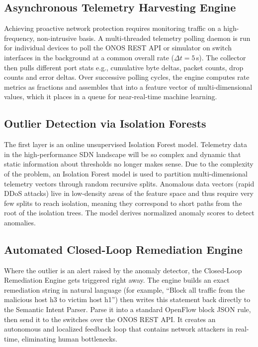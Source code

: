 \documentclass[conference]{IEEEtran}
\begin{document}
\subsection{Asynchronous Telemetry Harvesting Engine}
Achieving proactive network protection requires monitoring traffic on a high-frequency, non-intrusive basis. A multi-threaded telemetry polling daemon is run for individual devices to poll the ONOS REST API or simulator on switch interfaces in the background at a common overall rate ($\Delta t = 5$\,s). The collector then pulls different port stats e.g., cumulative byte deltas, packet counts, drop counts and error deltas. Over successive polling cycles, the engine computes rate metrics as fractions and assembles that into a feature vector of multi-dimensional values, which it places in a queue for near-real-time machine learning.

\subsection{Outlier Detection via Isolation Forests}
The first layer is an online unsupervised Isolation Forest model. Telemetry data in the high-performance SDN landscape will be so complex and dynamic that static information about thresholds no longer makes sense. Due to the complexity of the problem, an Isolation Forest model is used to partition multi-dimensional telemetry vectors through random recursive splits. Anomalous data vectors (rapid DDoS attacks) live in low-density areas of the feature space and thus require very few splits to reach isolation, meaning they correspond to short paths from the root of the isolation trees. The model derives normalized anomaly scores to detect anomalies.

\subsection{Automated Closed-Loop Remediation Engine}
Where the outlier is an alert raised by the anomaly detector, the Closed-Loop Remediation Engine gets triggered right away. The engine builds an exact remediation string in natural language (for example, ``Block all traffic from the malicious host h3 to victim host h1'') then writes this statement back directly to the Semantic Intent Parser. Parse it into a standard OpenFlow block JSON rule, then send it to the switches over the ONOS REST API. It creates an autonomous and localized feedback loop that contains network attackers in real-time, eliminating human bottlenecks.
\end{document}
